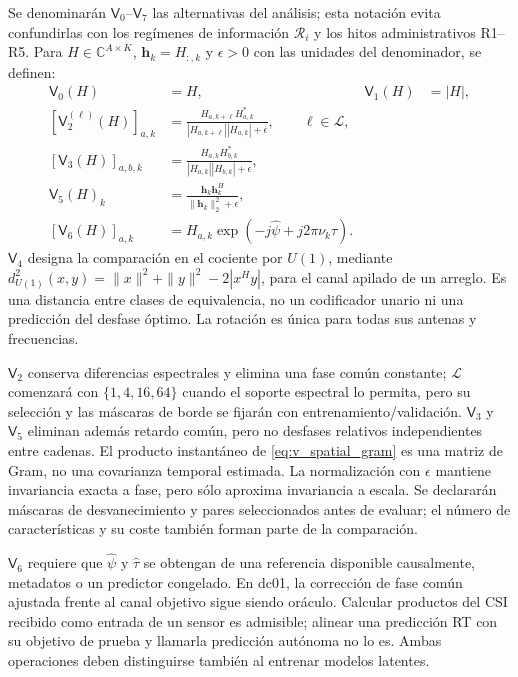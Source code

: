 Se denominarán $\mathsf V_0$--$\mathsf V_7$ las alternativas del análisis; esta
notación evita confundirlas con los regímenes de información $\mathcal R_i$ y los
hitos administrativos R1--R5. Para $H\in\mathbb C^{A\times K}$, $\mathbf h_k=H_{:,k}$
y $\epsilon>0$ con las unidades del denominador, se definen:
\begin{align}
\mathsf V_0(H)&=H, &\mathsf V_1(H)&=|H|,\nonumber\\
[\mathsf V_2^{(\ell)}(H)]_{a,k}&=\frac{H_{a,k+\ell}H_{a,k}^{*}}
{|H_{a,k+\ell}||H_{a,k}|+\epsilon},\qquad \ell\in\mathcal L,
\label{eq:v_frequency_products}\\
[\mathsf V_3(H)]_{a,b,k}&=\frac{H_{a,k}H_{b,k}^{*}}
{|H_{a,k}||H_{b,k}|+\epsilon},\label{eq:v_antenna_products}\\
\mathsf V_5(H)_k&=\frac{\mathbf h_k\mathbf h_k^{H}}
{\|\mathbf h_k\|_2^2+\epsilon},\label{eq:v_spatial_gram}\\
[\mathsf V_6(H)]_{a,k}&=H_{a,k}\exp(-j\widehat\psi+j2\pi\nu_k\widehat\tau).
\label{eq:v_canonical_channel}
\end{align}
$\mathsf V_4$ designa la comparación en el cociente por $U(1)$, mediante
$d_{U(1)}^2(x,y)=\|x\|^2+\|y\|^2-2|x^Hy|$, para el canal apilado de un arreglo.
Es una distancia entre clases de equivalencia, no un codificador unario ni una
predicción del desfase óptimo. La rotación es única para todas sus antenas y frecuencias.

$\mathsf V_2$ conserva diferencias espectrales y elimina una fase común constante;
$\mathcal L$ comenzará con $\{1,4,16,64\}$ cuando el soporte espectral lo permita,
pero su selección y las máscaras de borde se fijarán con entrenamiento/validación.
$\mathsf V_3$ y $\mathsf V_5$ eliminan además retardo común, pero no desfases
relativos independientes entre cadenas. El producto instantáneo de
\cref{eq:v_spatial_gram} es una matriz de Gram, no una covarianza temporal estimada.
La normalización con $\epsilon$ mantiene invariancia exacta a fase, pero sólo
aproxima invariancia a escala. Se declararán máscaras de desvanecimiento y pares
seleccionados antes de evaluar; el número de características y su coste también
forman parte de la comparación.

$\mathsf V_6$ requiere que $\widehat\psi$ y $\widehat\tau$ se obtengan de una
referencia disponible causalmente, metadatos o un predictor congelado. En dc01,
la corrección de fase común ajustada frente al canal objetivo sigue siendo oráculo.
Calcular productos del CSI recibido como entrada de un sensor es admisible;
alinear una predicción RT con su objetivo de prueba y llamarla predicción autónoma
no lo es. Ambas operaciones deben distinguirse también al entrenar modelos latentes.

